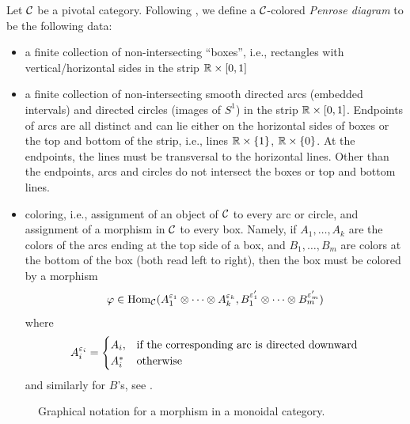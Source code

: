 Let $\mathcal{C}$ be a pivotal category. Following , we
define a $\mathcal{C}$-colored \emph{Penrose diagram} to be the following data:
\begin{itemize}
  \item a finite collection of non-intersecting ``boxes'', i.e., rectangles
  with vertical/horizontal sides in the strip $\mathbb{R}\times [0,1]$
  \item a finite collection of non-intersecting smooth directed arcs (embedded
  intervals) and directed circles (images of $S^1$) in the strip $\mathbb{R}\times
  [0,1]$. Endpoints of arcs are all distinct and can lie
  either on the horizontal sides of boxes or the top and bottom of the strip,
  i.e., lines $\mathbb{R}\times\{1\}$, $\mathbb{R}\times \{0\}$. At the endpoints, the lines
  must be transversal to the horizontal lines. Other than the endpoints, arcs
  and circles do not intersect the boxes or top and bottom lines.
  \item coloring, i.e., assignment of an object of $\mathcal{C}$ to every arc or
  circle, and assignment of a morphism in $\mathcal{C}$ to every box. Namely, if
  $A_1, \dots, A_k$ are the colors of the arcs ending at the top side of a box,
  and $B_1, \dots, B_m$ are colors at the bottom of the box (both read left to
  right), then the box must be colored by a morphism
  $$
    \varphi\in \operatorname{Hom}_{\mathcal{C}}(
      A_1^{\varepsilon_1}\otimes\dots\otimes A_k^{\varepsilon_k},
      B_1^{\varepsilon'_1}\otimes\dots\otimes B_m^{\varepsilon'_m}
    )
  $$
  where
  \begin{equation}\label{e:signed-object}
    A_i^{\varepsilon_i} =\begin{cases}
                 A_i, & \text{if the corresponding arc is directed downward}\\
                 A_i^* &\text{otherwise}
                 \end{cases}
  \end{equation}
  and similarly for $B$'s, see .
\end{itemize}
\begin{figure}[h]
  \centering
  \caption{Graphical notation for a morphism in a monoidal category.}
  \label{f:graphical-morphism2}
\end{figure}

